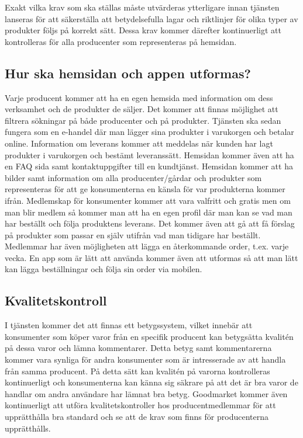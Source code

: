 \documentclass[10pt,a4paper,oneside]{article}
\begin{document}
Exakt vilka krav som ska ställas måste utvärderas ytterligare innan tjänsten lanseras för att säkerställa att betydelsefulla lagar och riktlinjer för olika typer av produkter följs på korrekt sätt. Dessa krav kommer därefter kontinuerligt att kontrolleras för alla producenter som representeras på hemsidan. 

\subsection{Hur ska hemsidan och appen utformas?}
Varje producent kommer att ha en egen hemsida med information om dess verksamhet och de produkter de säljer. Det kommer att finnas möjlighet att filtrera sökningar på både producenter och på produkter. Tjänsten ska sedan fungera som en e-handel där man lägger sina produkter i varukorgen och betalar online. Information om leverans kommer att meddelas när kunden har lagt produkter i varukorgen och bestämt leveranssätt. Hemsidan kommer även att ha en FAQ sida samt kontaktuppgifter till en kundtjänst. Hemsidan kommer att ha bilder samt information om alla producenter/gårdar och produkter som representeras för att ge konsumenterna en känsla för var produkterna kommer ifrån. Medlemskap för konsumenter kommer att vara valfritt och gratis men om man blir medlem så kommer man att ha en egen profil där man kan se vad man har beställt och följa produktens leverans. Det kommer även att gå att få förslag på produkter som passar en själv utifrån vad man tidigare har beställt. Medlemmar har även möjligheten att lägga en återkommande order, t.ex. varje vecka. En app som är lätt att använda kommer även att utformas så att man lätt kan lägga beställningar och följa sin order via mobilen.  


\subsection{Kvalitetskontroll}
I tjänsten kommer det att finnas ett betygssystem, vilket innebär att konsumenter som köper varor från en specifik producent kan betygsätta kvalitén på dessa varor och lämna kommentarer. Detta betyg samt kommentarerna kommer vara synliga för andra konsumenter som är intresserade av att handla från samma producent. På detta sätt kan kvalitén på varorna kontrolleras kontinuerligt och konsumenterna kan känna sig säkrare på att det är bra varor de handlar om andra användare har lämnat bra betyg. Goodmarket kommer även kontinuerligt att utföra kvalitetskontroller hos producentmedlemmar för att upprätthålla bra standard och se att de krav som finns för producenterna upprätthålls. 
\end{document}
